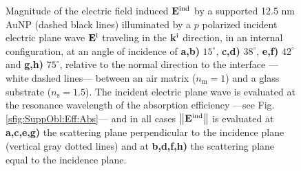  \begin{figure}\centering
    \def\svgwidth{.7\textwidth}
    \scriptsize
    \\[-62.75em]
    \hspace*{-.255\textwidth}
        \begin{subfigure}{.25\textwidth}\caption{ } \label{sfig:Near:SuppObl:p:15:perp}\end{subfigure}%
        \begin{subfigure}{.3\textwidth}\caption{ }\label{sfig:Near:SuppObl:p:15:par}\end{subfigure}\\[12.8em]
    \hspace*{-.225\textwidth}
        \begin{subfigure}{.225\textwidth}\caption{ } \label{sfig:Near:SuppObl:p:38:perp}\end{subfigure}%
        \begin{subfigure}{.34\textwidth}\caption{ }\label{sfig:Near:SuppObl:p:38:par}\end{subfigure}\\[12.8em]
    \hspace*{-.225\textwidth}
        \begin{subfigure}{.225\textwidth}\caption{ } \label{sfig:Near:SuppObl:p:42:perp}\end{subfigure}%
        \begin{subfigure}{.34\textwidth}\caption{ }\label{sfig:Near:SuppObl:p:42:par}\end{subfigure}\\[12.8em]
    \hspace*{-.225\textwidth}
        \begin{subfigure}{.225\textwidth}\caption{ } \label{sfig:Near:SuppObl:p:75:perp}\end{subfigure}%
        \begin{subfigure}{.34\textwidth}\caption{ }\label{sfig:Near:SuppObl:p:75:par}\end{subfigure}\\[15.75em]
    \caption[Induced Electric Field of a 12.5 nm Au NP on substrate illuminated at oblique incidence with a $p$ polarized electric field]{\footnotesize%
    Magnitude of the electric field induced $\vb{E}^\text{ind}$ by a supported 12.5 nm AuNP (dashed black lines) illuminated by a $p$ polarized incident electric plane wave $\vb{E}^\text{i}$ traveling in the $\vb{k}^\text{i}$ direction, in an internal configuration, at an angle of incidence of \textbf{a,b)} $15^\circ$, \textbf{c,d)} $38^\circ$, \textbf{e,f)} $42^\circ$ and \textbf{g,h)} $75^\circ$, relative to the normal direction to the interface ---white dashed lines--- between an air matrix ($n_\text{m} = 1$) and a glass substrate ($n_\text{s} = 1.5$). The incident electric plane wave is evaluated at the resonance wavelength of the absorption efficiency ---see Fig. \ref{sfig:SuppObl:Eff:Abs}--- and in all cases $\norm{\vb{E}^\text{ind}}$ is evaluated at  \textbf{a,c,e,g)} the scattering plane perpendicular to the incidence plane (vertical gray dotted lines) and at \textbf{b,d,f,h)} the scattering plane equal to the incidence plane.
}
\end{figure}
